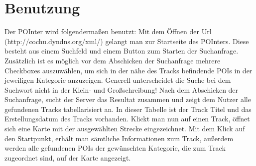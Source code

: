 \section{Benutzung}
Der POInter wird folgendermaßen benutzt:
Mit dem Öffnen der Url (http://cochu.dyndns.org/xml/) gelangt man zur Startseite des POInters.
Diese besteht aus einem Suchfeld und einem Button zum Starten der Suchanfrage.
Zusätzlich ist es möglich vor dem Abschicken der Suchanfrage mehrere Checkboxes auszuwählen,
um sich in der nähe des Tracks befindende POIs in der jeweiligen Kategorie anzuzeigen.
Generell unterscheidet die Suche bei dem Suchwort nicht in der Klein- und Großschreibung!
Nach dem Abschicken der Suchanfrage, sucht der Server das Resultat zusammen und zeigt dem Nutzer alle gefundenen
Tracks tabellarisiert an.
In dieser Tabelle ist der Track Titel und das Erstellungsdatum des Tracks vorhanden.
Klickt man nun auf einen Track, öffnet sich eine Karte mit der ausgewählten Strecke eingezeichnet.
Mit dem Klick auf den Startpunkt, erhält man sämtliche Informationen zum Track, außerdem werden alle
gefundenen POIs der gewünschten Kategorie, die zum Track zugeordnet sind, auf der Karte angezeigt.
